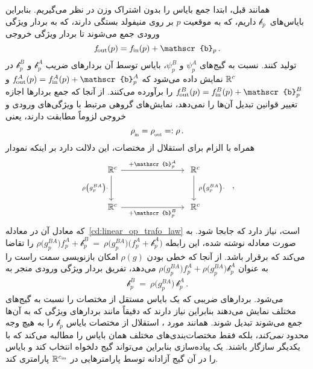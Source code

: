 همانند قبل، ابتدا جمع بایاس را بدون اشتراک وزن در نظر می‌گیریم.
بنابراین بایاس‌های~$\mathscr{b}_p$ داریم، که به موقعیت $p$ بر روی منیفولد بستگی دارند، که به بردار ویژگی ورودی جمع می‌شوند تا بردار ویژگی خروجی
\begin{align}
	\fout(p) = \fin(p) + \mathscr{b}_p \,.
\end{align}
تولید کنند.
نسبت به گیج‌های $\psi_p^A$ و $\psi_p^B$، بایاس توسط آن بردارهای ضریب $\mathscr{b}_p^A$ و $\mathscr{b}_p^B$ در $\mathbb{R}^c$ نمایش داده می‌شود که $\fout^A(p) = \fin^A(p) + \mathscr{b}_p^A$ و $\fout^B(p) = \fin^B(p) + \mathscr{b}_p^B$ را برآورده می‌کنند.
از آنجا که جمع بردارها اجازه تغییر قوانین تبدیل آن‌ها را نمی‌دهد، نمایش‌های گروهی مرتبط با ویژگی‌های ورودی و خروجی لزوماً مطابقت دارند، یعنی
\begin{align}
	\rhoin = \rhoout =: \rho \,.
\end{align}
همراه با الزام برای استقلال از مختصات، این دلالت دارد بر اینکه نمودار
\begin{equation}\label{eq:bias_trafo_law}
	\begin{tikzcd}[column sep=75pt, row sep=30pt, font=\normalsize]
		\R^c
		\arrow[d, "\rho \big(g_p^{BA}\big)\cdot\,"']
		\arrow[r, "+\mathscr{b}_p^A"]
		&
		\R^c
		\arrow[d, "\ \rho\big( g_p^{BA}\big) \cdot"]
		\\
		\R^c
		\arrow[r, "+\mathscr{b}_p^B"']
		&
		\R^c
	\end{tikzcd}
	\ \ ,
\end{equation}
که معادل آن در معادله~\eqref{cd:linear_op_trafo_law} است، نیاز دارد که جابجا شود.
به صورت معادله نوشته شده، این رابطه
$\rho\big(g_p^{BA}\big) f^A_p + \mathscr{b}_p^B \ =\ \rho\big(g_p^{BA}\big) \big(f^A_p + \mathscr{b}_p^A\big)$
را تقاضا می‌کند که برقرار باشد.
از آنجا که خطی بودن $\rho(g)$ امکان بازنویسی سمت راست را به عنوان
$\rho\big(g_p^{BA}\big) f^A_p + \rho\big(g_p^{BA}\big) \mathscr{b}_p^A$
می‌دهد، تفریق بردار ویژگی ورودی منجر به
\begin{align}\label{eq:bias_trafo_non_shared}
	\mathscr{b}_p^B\ =\ \rho\big(g_p^{BA}\big) \, \mathscr{b}_p^A \,.
\end{align}
می‌شود.
بردارهای ضریبی که یک بایاس مستقل از مختصات را نسبت به گیج‌های مختلف نمایش می‌دهند بنابراین نیاز دارند که دقیقاً مانند بردارهای ویژگی که به آن‌ها جمع می‌شوند تبدیل شوند.
همانند مورد \onexonesit، استقلال از مختصات بایاس $\mathscr{b}_p$ را به هیچ وجه محدود \emph{نمی‌کند}، بلکه فقط مختصات‌بندی‌های مختلف همان بایاس را مطالبه می‌کند که با یکدیگر سازگار باشند.
یک پیاده‌سازی بنابراین می‌تواند گیج دلخواه انتخاب کند و بایاس را در آن گیج آزادانه توسط پارامترهایی در $\mathbb{R}^{{c_\textup{in}}}$ پارامتری کند.


